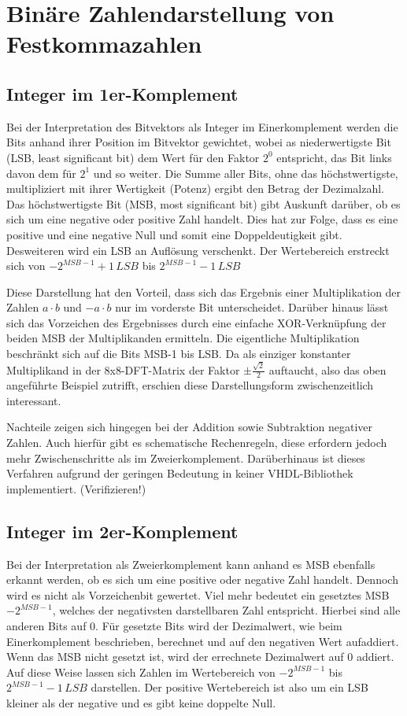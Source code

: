 \section{Binäre Zahlendarstellung von Festkommazahlen}

\subsection{Integer im 1er-Komplement}
Bei der Interpretation des Bitvektors als Integer im Einerkomplement werden die Bits anhand ihrer Position im Bitvektor gewichtet, wobei as niederwertigste Bit 
(LSB, least significant bit) dem Wert für den Faktor $2^0$ entspricht, das Bit links davon dem für $2^1$ und so weiter. Die Summe aller Bits, ohne das höchstwertigste, 
multipliziert mit ihrer Wertigkeit (Potenz) ergibt den Betrag der Dezimalzahl. Das höchstwertigste Bit (MSB, most significant bit) gibt Auskunft darüber, ob es sich 
um eine negative oder positive Zahl handelt. Dies hat zur Folge, dass es eine positive und eine negative Null und somit eine Doppeldeutigkeit gibt. Desweiteren wird
ein LSB an Auflösung verschenkt. Der Wertebereich erstreckt sich von $-2^{MSB-1}+1\,LSB$ bis $2^{MSB-1}-1\,LSB$

Diese Darstellung hat den Vorteil, dass sich das Ergebnis einer Multiplikation der Zahlen $a \cdot b$ und $-a \cdot b$ nur im vorderste Bit unterscheidet. Darüber hinaus
lässt sich das Vorzeichen des Ergebnisses durch eine einfache XOR-Verknüpfung der beiden MSB der Multiplikanden ermitteln. 
Die eigentliche Multiplikation beschränkt sich auf die Bits MSB-1 bis LSB.
Da als einziger konstanter Multiplikand in der 8x8-DFT-Matrix der Faktor $\pm\frac{\sqrt{2}}{2}$ auftaucht, also das oben angeführte Beispiel zutrifft, erschien diese
Darstellungsform zwischenzeitlich interessant.

Nachteile zeigen sich hingegen bei der Addition sowie Subtraktion negativer Zahlen. Auch hierfür gibt es schematische Rechenregeln, diese erfordern jedoch mehr 
Zwischenschritte als im Zweierkomplement. Darüberhinaus ist dieses Verfahren aufgrund der geringen Bedeutung in keiner VHDL-Bibliothek implementiert.
(Verifizieren!)


\subsection{Integer im 2er-Komplement}
Bei der Interpretation als Zweierkomplement kann anhand es MSB ebenfalls erkannt werden, ob es sich um eine positive oder negative Zahl handelt. Dennoch wird es nicht
als Vorzeichenbit gewertet. Viel mehr bedeutet ein gesetztes MSB $-2^{MSB-1}$, welches der negativsten darstellbaren Zahl entspricht. Hierbei sind alle anderen 
Bits auf 0. Für gesetzte Bits wird der Dezimalwert, wie beim Einerkomplement beschrieben, berechnet und auf den negativen Wert aufaddiert. Wenn das MSB nicht gesetzt
ist, wird der errechnete Dezimalwert auf 0 addiert. Auf diese Weise lassen sich Zahlen im Wertebereich von $-2^{MSB-1}$ bis $2^{MSB-1}-1 \,LSB$ darstellen. Der positive
Wertebereich ist also um ein LSB kleiner als der negative und es gibt keine doppelte Null.

